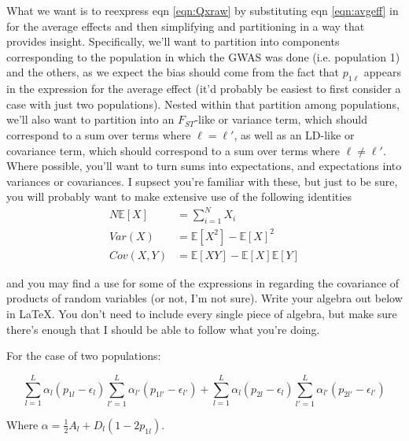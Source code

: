 \documentclass[a4paper,10pt]{article}
\begin{document}
What we want is to reexpress eqn \eqref{eqn:Qxraw} by substituting eqn \eqref{eqn:avgeff} in for the average effects and then simplifying and partitioning in a way that provides insight. Specifically, we'll want to partition into components corresponding to the population in which the GWAS was done (i.e. population 1) and the others, as we expect the bias should come from the fact that $p_{1\ell}$ appears in the expression for the average effect (it'd probably be easiest to first consider a case with just two populations). Nested within that partition among populations, we'll also want to partition into an $F_{ST}$-like or variance term, which should correspond to a sum over terms where $\ell = \ell\prime$, as well as an LD-like or covariance term, which should correspond to a sum over terms where $\ell \neq \ell\prime$. Where possible, you'll want to turn sums into expectations, and expectations into variances or covariances. I supsect you're familiar with these, but just to be sure, you will probably want to make extensive use of the following identities
\begin{align}
  N \mathbb{E}[X] &= \sum_{i=1}^N X_i \\
  Var(X) &= \mathbb{E}[X^2] - \mathbb{E}[X]^2 \\
  Cov(X,Y) &= \mathbb{E}[XY] - \mathbb{E}[X]\mathbb{E}[Y]
\end{align}

and you may find a use for some of the expressions in
\cite{Bohrnstedt:1969cz} regarding the covariance of products of
random variables (or not, I'm not sure). Write your algebra out below
in \LaTeX. You don't need to include every single piece of algebra,
but make sure there's enough that I should be able to follow what
you're doing.

\vspace{10mm}

For the case of two populations:

\begin{equation}
  \sum_{l=1}^L \alpha_l (p_{1l}-\epsilon_l) \sum_{l'=1}^L \alpha_{l'} (p_{1l'} - \epsilon_{l'}) + \sum_{l=1}^L \alpha_l (p_{2l}-\epsilon_l) \sum_{l'=1}^L \alpha_{l'} (p_{2l'} - \epsilon_{l'}) 
  \label{two_pop}
\end{equation}

Where $\alpha = \frac{1}{2}A_l+D_l(1-2p_{1l})$.
\end{document}
